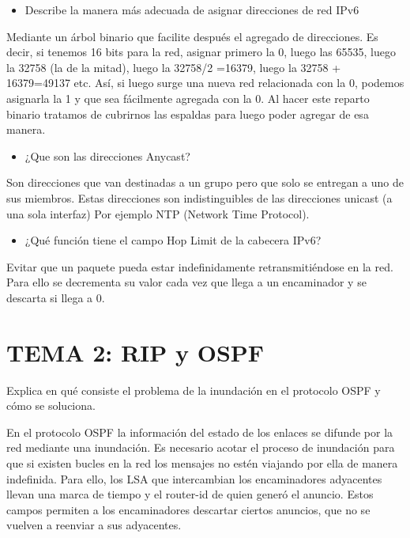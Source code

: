 \documentclass[]{article}
\providecommand{\tightlist}{%
  \setlength{\itemsep}{0pt}\setlength{\parskip}{0pt}}
\begin{document}
\begin{itemize}
\tightlist
\item
  Describe la manera más adecuada de asignar direcciones de red IPv6
\end{itemize}

Mediante un árbol binario que facilite después el agregado de
direcciones. Es decir, si tenemos 16 bits para la red, asignar primero
la 0, luego las 65535, luego la 32758 (la de la mitad), luego la 32758/2
=16379, luego la 32758 + 16379=49137 etc. Así, si luego surge una nueva
red relacionada con la 0, podemos asignarla la 1 y que sea fácilmente
agregada con la 0. Al hacer este reparto binario tratamos de cubrirnos
las espaldas para luego poder agregar de esa manera.

\begin{itemize}
\tightlist
\item
  ¿Que son las direcciones Anycast?
\end{itemize}

Son direcciones que van destinadas a un grupo pero que solo se entregan
a uno de sus miembros. Estas direcciones son indistinguibles de las
direcciones unicast (a una sola interfaz) Por ejemplo NTP (Network Time
Protocol).

\begin{itemize}
\tightlist
\item
  ¿Qué función tiene el campo Hop Limit de la cabecera IPv6?
\end{itemize}

Evitar que un paquete pueda estar indefinidamente retransmitiéndose en
la red. Para ello se decrementa su valor cada vez que llega a un
encaminador y se descarta si llega a 0.

\hypertarget{tema-2-rip-y-ospf}{%
\section{TEMA 2: RIP y OSPF}\label{tema-2-rip-y-ospf}}

Explica en qué consiste el problema de la inundación en el protocolo
OSPF y cómo se soluciona.

En el protocolo OSPF la información del estado de los enlaces se difunde
por la red mediante una inundación. Es necesario acotar el proceso de
inundación para que si existen bucles en la red los mensajes no estén
viajando por ella de manera indefinida. Para ello, los LSA que
intercambian los encaminadores adyacentes llevan una marca de tiempo y
el router-id de quien generó el anuncio. Estos campos permiten a los
encaminadores descartar ciertos anuncios, que no se vuelven a reenviar a
sus adyacentes.
\end{document}
